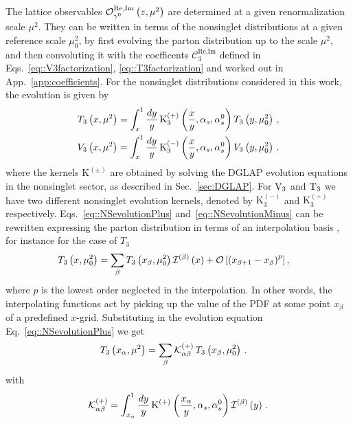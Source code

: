 %
The lattice observables $\mathcal{O}_{\gamma^0}^{\text{Re},\text{Im}}\left( z,
\mu^2 \right)$ are determined at a given renormalization scale $\mu^2$. They can be
written in terms of the nonsinglet distributions at a given reference scale
$\mu_0^2$, by first evolving the parton distribution up to the scale $\mu^2$,
and then convoluting it with the coefficents
$\mathcal{C}_3^{\text{Re},\text{Im}}$ defined in
Eqs.~\eqref{eq::V3factorization}, \eqref{eq::T3factorization} and worked out in
App.~\ref{app:coefficients}. For the nonsinglet distributions considered in this work, the evolution is given by
\begin{align}
	\label{eq::NSevolutionPlus}
	T_3 \left( x, \mu^2 \right) = \int_x^1 \frac{dy}{y}\, 
	\text{K}_3^{(+)}\left( \frac{x}{y}, \alpha_s, \alpha_s^0 \right) T_3 \left( y, \mu_0^2 \right)\, , \\
	\label{eq::NSevolutionMinus}
	V_3 \left( x, \mu^2 \right) = \int_x^1 \frac{dy}{y}\, 
	\text{K}_3^{(-)}\left( \frac{x}{y}, \alpha_s, \alpha_s^0 \right) V_3 \left( y, \mu_0^2 \right)\, .
\end{align}
where the kernels $\text{K}^{(\pm)}$ are obtained by solving the DGLAP evolution
equations in the nonsinglet sector, as described in Sec.~\ref{sec:DGLAP}.
For $\mathrm{V}_3$ and $\mathrm{T}_3$ we have two different
nonsinglet evolution kernels, denoted by $\text{K}_3^{(-)}$ and
$\text{K}_3^{(+)}$ respectively. Eqs.~\eqref{eq::NSevolutionPlus}
and~\eqref{eq::NSevolutionMinus} can be rewritten expressing the parton
distribution in terms of an interpolation basis \cite{Ball:2010de}, for instance for the case of
$T_3$
\begin{align}
	  & T_3\left( x, \mu_0^2 \right) = \sum_{\beta}T_3\left( x_{\beta}, \mu_0^2\right)\mathcal{I}^{(\beta)}\left( x \right) 
          + \mathcal{O}\left[\left(x_{\beta+1}-x_{\beta}\right)^p\right], 
\end{align}  
where $p$ is the lowest order neglected in the interpolation.
In other words, the interpolating functions
act by picking up the value of the PDF at some point $x_{\beta}$ of a
predefined $x$-grid. Substituting in the evolution equation
Eq.~\eqref{eq::NSevolutionPlus} we get
\begin{align}
	\label{eq::fastevol}
	T_3 \left( x_{\alpha}, \mu^2 \right) & = 
	\sum_{\beta} \mathcal{K}^{(+)}_{\alpha\beta}\,
	T_3 \left( x_{\beta}, \mu_0^2 \right)\, . 
\end{align}
with
\begin{align}
	\mathcal{K}^{(+)}_{\alpha\beta} = \int_{x_{\alpha}}^1 \frac{dy}{y}\, 
	\text{K}^{(+)} \left( \frac{x_{\alpha}}{y}, \alpha_s, \alpha_s^0 \right) 
	\mathcal{I}^{(\beta)}\left( y \right) \, .
\end{align}
